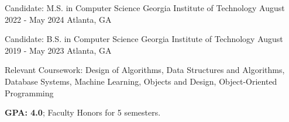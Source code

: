 


\begin{cventries}

\cventry
{Candidate: M.S. in Computer Science}
{Georgia Institute of Technology}
{August 2022 - May 2024}
{Atlanta, GA}
{}


\cventry
{Candidate: B.S. in Computer Science}
{Georgia Institute of Technology}
{August 2019 - May 2023}
{Atlanta, GA}
{\begin{cvitems}
\item {Relevant Coursework: Design of Algorithms, Data Structures and Algorithms, Database Systems, Machine Learning, Objects and Design, Object-Oriented Programming}
\item \textbf{GPA: 4.0}; Faculty Honors for 5 semesters.
\end{cvitems}
}


\end{cventries}
